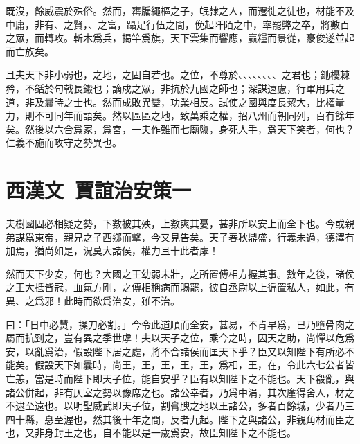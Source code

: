 既沒，餘威震於殊俗。然而，罋牖繩樞之子，氓隸之人，而遷徙之徒也，材能不及中庸，非有、之賢，、之富，躡足行伍之間，俛起阡陌之中，率罷弊之卒，將數百之眾，而轉攻。斬木爲兵，揭竿爲旗，天下雲集而響應，贏糧而景從，豪俊遂並起而亡族矣。

且夫天下非小弱也，之地，之固自若也。之位，不尊於、、、、、、、、之君也；鋤櫌棘矜，不銛於句戟長鎩也；謫戍之眾，非抗於九國之師也；深謀遠慮，行軍用兵之道，非及曩時之士也。然而成敗異變，功業相反。試使之國與度長絜大，比權量力，則不可同年而語矣。然以區區之地，致萬乘之權，招八州而朝同列，百有餘年矣。然後以六合爲家，爲宮，一夫作難而七廟隳，身死人手，爲天下笑者，何也？仁義不施而攻守之勢異也。

\section[賈誼治安策一\quad{\small 西漢文}]{{\normalsize 西漢文\ 賈誼}\quad 治安策一}
夫樹國固必相疑之勢，下數被其殃，上數爽其憂，甚非所以安上而全下也。今或親弟謀爲東帝，親兄之子西鄉而擊，今又見告矣。天子春秋鼎盛，行義未過，德澤有加焉，猶尚如是，況莫大諸侯，權力且十此者虖！

然而天下少安，何也？大國之王幼弱未壯，之所置傅相方握其事。數年之後，諸侯之王大抵皆冠，血氣方剛，之傅相稱病而賜罷，彼自丞尉以上徧置私人，如此，有異、之爲邪！此時而欲爲治安，雖不治。

曰：「日中必熭，操刀必割。」今令此道順而全安，甚易，不肯早爲，已乃墮骨肉之屬而抗剄之，豈有異之季世虖！夫以天子之位，乘今之時，因天之助，尚憚以危爲安，以亂爲治，假設陛下居之處，將不合諸侯而匡天下乎？臣又以知陛下有所必不能矣。假設天下如曩時，尚王，王，王，王，王，爲相，王，在，令此六七公者皆亡恙，當是時而陛下即天子位，能自安乎？臣有以知陛下之不能也。天下殽亂，與諸公併起，非有仄室之勢以豫席之也。諸公幸者，乃爲中涓，其次廑得舍人，材之不逮至遠也。以明聖威武即天子位，割膏腴之地以王諸公，多者百餘城，少者乃三四十縣，惪至渥也，然其後十年之間，反者九起。陛下之與諸公，非親角材而臣之也，又非身封王之也，自不能以是一歲爲安，故臣知陛下之不能也。

